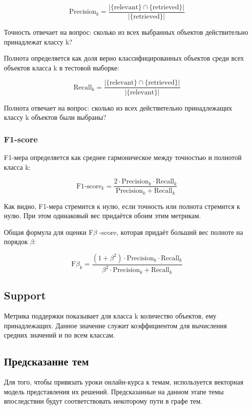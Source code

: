 \documentclass[14pt]{matmex-diploma-custom}
\begin{document}
\[
\text{Precision}_{k}=\frac{|\{\text{relevant}\}\cap\{\text{retrieved}\}|}{|\{\text{retrieved}\}|}
\]

Точность отвечает на вопрос: сколько из всех выбранных объектов действительно принадлежат классу k?

Полнота определяется как доля верно классифицированных объектов среди всех объектов класса k в тестовой выборке:

\[
\text{Recall}_{k}=\frac{|\{\text{relevant}\}\cap\{\text{retrieved}\}|}{|\{\text{relevant}\}|}
\]

Полнота отвечает на вопрос: сколько из всех действительно принадлежащих классу k объектов были выбраны?

\subsubsection*{F1-score}

F1-мера определяется как среднее гармоническое между точностью и полнотой класса k:

\[
\text{F1-score}_{k}=\frac{2\cdot\text{Precision}_{k}\cdot\text{Recall}_{k}}{\text{Precision}_{k} + \text{Recall}_{k}}
\]

Как видно, F1-мера стремится к нулю, если точность или полнота стремится к нулю. При этом одинаковый вес придаётся обоим этим метрикам.

Общая формула для оценки F$\beta$ -score, которая придаёт больший вес полноте на порядок $\beta$:

\[
\text{F$\beta$}_{k}=\frac{(1+\beta^2)\cdot\text{Precision}_{k}\cdot\text{Recall}_{k}}{\beta^2\cdot\text{Precision}_{k} + \text{Recall}_{k}}
\]

\subsection*{Support}

Метрика поддержки показывает для класса k количество объектов, ему принадлежащих. Данное значение служит коэффициентом для вычисления средних значений  и  по всем классам.

\subsection{Предсказание тем} 
Для того, чтобы привязать уроки онлайн-курса к темам, используется векторная модель представления их решений. Предсказанные на данном этапе темы впоследствии будут соответствовать некоторому пути в графе тем.
\end{document}

